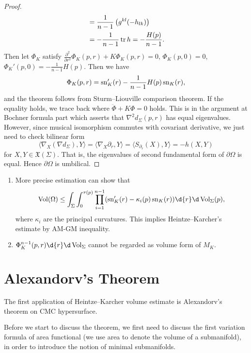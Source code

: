 \begin{proof}
\begin{align*}
        &=\frac{1}{n-1}\left(g^{kl}(-h_{lk})\right)\\
        &=-\frac{1}{n-1}\operatorname{tr}{h}=-\frac{H(p)}{n-1}.
    \end{align*}
    Then let $\Phi_K$ satisfy $\frac{\partial^2{}}{\partial{r^2}}\Phi_K(p,r)+K\Phi_K(p,r)=0$, $\Phi_K(p,0)=0$, $\Phi_K'(p,0)=-\frac{1}{n-1}H(p)$.
    Then we have
    \[\Phi_K(p,r)=\operatorname{sn}_K'(r)-\frac{1}{n-1}H(p)\operatorname{sn}_K(r),\]
    and the theorem follows from Sturm--Liouville comparison theorem.
    If the equality holds, we trace back where $\ddot{\Phi}+K\Phi=0$ holds.
    This is in the argument at Bochner formula part which asserts that $\nabla^2d_\Sigma(p,r)$ has equal eigenvalues.
    However, since musical isomorphism commutes with covariant derivative, we just need to check bilinear form
    \[\langle\nabla_X(\nabla d_\Sigma),Y\rangle=\langle\nabla_X\partial_r,Y\rangle=\langle S_{\partial_r}(X),Y\rangle=-h(X,Y)\]
    for $X,Y\in\mathfrak{X}(\Sigma)$.
    That is, the eigenvalues of second fundamental form of $\partial\Omega$ is equal.
    Hence $\partial\Omega$ is umbilical.
\end{proof}

\begin{rem}
    \begin{enumerate}[(1)]
        \item More precise estimation can show that
        \[\Vol(\Omega)\leq\int_\Sigma\int_0^{\tau(p)}\prod_{i=1}^{n-1}(\sn'_K(r)-\kappa_i(p)\sn_K(r))\d{r}\d\Vol_\Sigma(p),\]
        where $\kappa_i$ are the principal curvatures.
        This implies Heintze--Karcher's estimate by AM-GM inequality.
        \item $\Phi_K^{n-1}(p,r)\d{r}\d\Vol_\Sigma$ cannot be regarded as volume form of $M_K$.
    \end{enumerate}
\end{rem}

\section{Alexandorv's Theorem}

The first application of Heintze--Karcher volume estimate is Alexandorv's theorem on CMC hypersurface.

Before we start to discuss the theorem, we first need to discuss the first variation formula of area functional (we use area to denote the volume of a submanifold), in order to introduce the notion of minimal submanifolds.

